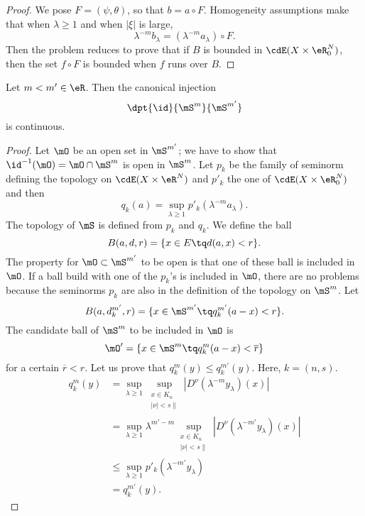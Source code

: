 \begin{proof}
We pose $F=(\psi,\theta)$, so that $b=a\circ F$. Homogeneity assumptions make that when $\lambda\geq 1$ and when $|\xi|$ is large, 
\[
   \lambda^{-m}b_{\lambda}=(\lambda^{-m}a_{\lambda})\circ F.
\]
Then the problem reduces to prove that if $B$ is bounded in $\cdE(X\times\eR^N_0)$, then the set $f\circ F$ is bounded when $f$ runs over $B$.
\end{proof}


\begin{lemma}
Let $m<m'\in\eR$. Then the canonical injection
\[ 
\dpt{\id}{\mS^m}{\mS^{m'}}
\]
is continuous.

\end{lemma}


\begin{proof}
Let $\mO$ be an open set in $\mS^{m'}$; we have to show that $\id^{-1}(\mO)=\mO\cap\mS^{m}$ is open in $\mS^m$. Let $p_k$ be the family of seminorm defining the topology on $\cdE(X\times\eR^N)$ and $p'_k$ the one of $\cdE(X\times\eR^N_0)$ and then
\[ 
q_k(a)=\sup_{\lambda\geq 1}p'_k(\lambda^{-m}a_{\lambda}).
\]
The topology of $\mS$ is defined from $p_k$ and $q_k$. We define the ball
\[ 
B(a,d,r)=\{x\in E\tq d(a,x)<r\}.
\]
The property for $\mO\subset\mS^{m'}$ to be open is that one of these ball is included in $\mO$. If a ball build with one of the $p_k$'s is included in $\mO$, there are no problems because the seminorms $p_k$ are also in the definition of the topology on $\mS^m$. Let
\[ 
  B(a,d_k^{m'},r)=\{x\in\mS^{m'}\tq q_k^{m'}(a-x)<r\}.
\]
The candidate ball of $\mS^m$ to be included in $\mO$ is
\[ 
\mO'=\{x\in\mS^m\tq q_k^m(a-x)<\overline{r}\}
\]
for a certain $\overline{r}<r$. Let us prove that $q_k^m(y)\leq q_k^{m'}(y)$. Here, $k=(n,s)$.
\begin{equation}
\begin{split}
q_k^m(y)&=\sup_{\lambda\geq 1}\sup_{\substack{x\in K_n\\|\nu|<s\|}}| D^{\nu}(\lambda^{-m}y_{\lambda})(x) |\\
        &=\sup_{\lambda\geq 1}\lambda^{m'-m}\sup_{\substack{x\in K_n\\|\nu|<s\|}}| D^{\nu}(\lambda^{-m'}y_{\lambda})(x) |\\
        &\leq\sup_{\lambda\geq 1}p'_k(\lambda^{-m'}y_{\lambda})\\
        &=q_k^{m'}(y).
\end{split}
\end{equation}

\end{proof}

